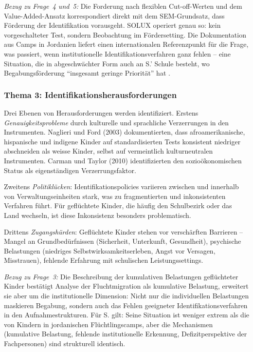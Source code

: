 \documentclass[ngerman, a4paper]{article}
\begin{document}
\textit{Bezug zu Frage~4 und~5:} Die Forderung nach flexiblen
Cut-off-Werten und dem Value-Added-Ansatz korrespondiert direkt mit dem
SEM-Grundsatz, dass Förderung der Identifikation vorausgeht. SOLUX
operiert genau so: kein vorgeschalteter Test, sondern Beobachtung im
Fördersetting. Die Dokumentation aus Camps in Jordanien liefert einen
internationalen Referenzpunkt für die Frage, was passiert, wenn
institutionelle Identifikationsverfahren ganz fehlen -- eine Situation, die
in abgeschwächter Form auch an S.' Schule besteht, wo Begabungsförderung
\enquote{insgesamt geringe Priorität} hat
\parencite{dvs2025bbf}.

\subsubsection*{Thema 3: Identifikationsherausforderungen}

Drei Ebenen von Herausforderungen werden identifiziert. Erstens
\textit{Genauigkeitsprobleme} durch kulturelle und sprachliche
Verzerrungen in den Instrumenten. Naglieri und Ford (2003) dokumentierten,
dass afroamerikanische, hispanische und indigene Kinder auf
standardisierten Tests konsistent niedriger abschneiden als weisse Kinder,
selbst auf vermeintlich kulturneutralen Instrumenten. Carman und Taylor
(2010) identifizierten den sozioökonomischen Status als eigenständigen
Verzerrungsfaktor.

Zweitens \textit{Politiklücken}: Identifikationspolicies variieren
zwischen und innerhalb von Verwaltungseinheiten stark, was zu
fragmentierten und inkonsistenten Verfahren führt. Für geflüchtete Kinder,
die häufig den Schulbezirk oder das Land wechseln, ist diese Inkonsistenz
besonders problematisch.

Drittens \textit{Zugangshürden}: Geflüchtete Kinder stehen vor
verschärften Barrieren -- Mangel an Grundbedürfnissen (Sicherheit,
Unterkunft, Gesundheit), psychische Belastungen (niedriges
Selbstwirksamkeitserleben, Angst vor Versagen, Misstrauen), fehlende
Erfahrung mit schulischen Leistungssettings.

\textit{Bezug zu Frage~3:} Die Beschreibung der kumulativen Belastungen
geflüchteter Kinder bestätigt \textcite[S.\,86--98]{behrensen2019inklusive} Analyse
der Fluchtmigration als kumulative Belastung, erweitert sie aber um die
institutionelle Dimension: Nicht nur die individuellen Belastungen
maskieren Begabung, sondern auch das Fehlen geeigneter
Identifikationsverfahren in den Aufnahmestrukturen. Für S. gilt: Seine
Situation ist weniger extrem als die von Kindern in jordanischen
Flüchtlingscamps, aber die Mechanismen (kumulative Belastung, fehlende
institutionelle Erkennung, Defizitperspektive der Fachpersonen) sind
strukturell identisch.
\end{document}
